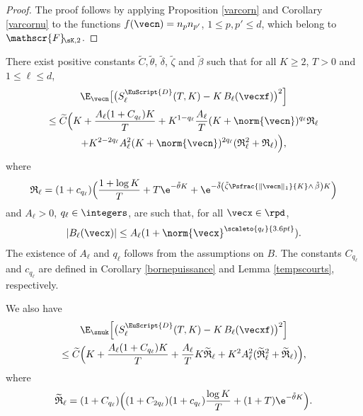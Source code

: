 \begin{proof}
The proof follows by applying Proposition \ref{varcorn} and Corollary \ref{varcornu} to the functions
$f(\vecn)=n_p n_{p'}$, $1\leq p,p' \leq d$, which belong to $\mathscr{F}\!_{\sK,2}$.
\end{proof}

\begin{proposition}
There exist positive constants $\widetilde{C}, \tilde{\theta}$, $\tilde{\delta}$, $\tilde{\zeta}$ and $\tilde{\beta}$ such that for all $K\geq 2$, $T>0$ and $1\leq \ell\leq d$,
\begin{multline*}
\E_{\vecn}\bigl[\bigl(S^{{ \EuScript{D}}}_{\ell}(T,K)-K\,B_{\ell}(\vecxf)\bigr)^2\Bigr]\\
\le\widetilde{C} \Bigl(
K + \frac{A_\ell (1+C_{q_\ell}) K}{T} + K^{1-q_\ell} \frac{A_\ell}{T} (K+\norm{\vecn})^{q_\ell} \mathfrak{R}_\ell \\
+ K^{{2}-{2}q_\ell} A_\ell^2
(K+\norm{\vecn})^{2q_\ell}(\mathfrak{R}_\ell^2+\mathfrak{R}_\ell)
\Bigr),
\end{multline*}
where
\[
\mathfrak{R}_\ell=
(1+c_{q_\ell}) \Bigl(\frac{1+\log K}{T} + T \e^{-\tilde{\theta} K}
+ \e^{-\tilde{\delta}\left(\tilde{\zeta}\Psfrac{\|\vecn\|_{1}}{K}\wedge\, \tilde{\beta}\right)K} \Bigr)
\]
and $A_\ell>0$, $q_\ell\in\integers$, are such that, for all $\vecx \in \rpd$,
\[
|B_\ell(\vecx)|\leq A_\ell (1+ \norm{\vecx}^{\scaleto{q_\ell}{3.6pt}}).
\]
The existence of $A_\ell$ and $q_\ell$ follows from the assumptions on $B$. The constants $C_{q_\ell}$ and $c_{q_\ell}$ are
defined in Corollary \ref{bornepuissance} and Lemma \ref{tempscourts}, respectively.

We also have
\begin{multline*}
\E_{\snuk} \Bigl[\bigl(S^{{ \EuScript{D}}}_{\ell}(T,K)-K\,B_{\ell}(\vecxf)\bigr)^2 \Bigr]\\
\le
\widetilde{C} \Bigl(K + \frac{A_\ell (1+C_{q_\ell}) K}{T} + \frac{A_\ell}{T} K \widetilde{\mathfrak{R}}_\ell +
K^2 A_\ell^2 (\widetilde{\mathfrak{R}}_\ell^2+\widetilde{\mathfrak{R}}_\ell) \Bigr),
\end{multline*}
where
\[
\widetilde{\mathfrak{R}}_\ell=(1+C_{q_\ell}) \Bigl((1+C_{2q_\ell})(1+c_{q_\ell})\frac{\log K}{T} +(1+T) \e^{-\tilde{\theta} K} \Bigr).
\]
\end{proposition}

